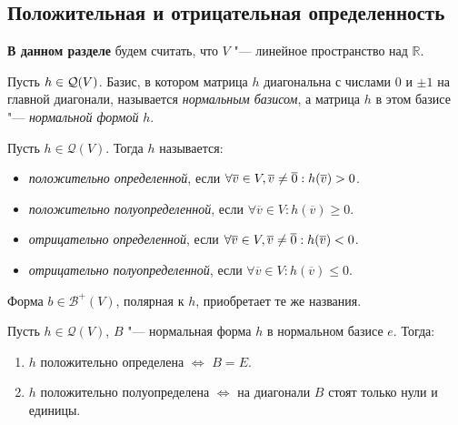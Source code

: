 \subsection{Положительная и отрицательная определенность}

\textbf{В данном разделе} будем считать, что $V$ "--- линейное пространство над $\mathbb{R}$.

\begin{definition}
	Пусть $h \hm{\in} \mathcal{Q}(V)$. Базис, в котором матрица $h$ диагональна с числами $0$ и $\pm1$ на главной диагонали, называется \textit{нормальным базисом}, а матрица $h$ в этом базисе "--- \textit{нормальной формой} $h$.
\end{definition}

\begin{definition}
	Пусть $h \in \mathcal{Q}(V)$. Тогда $h$ называется:
	\begin{itemize}
		\item \textit{положительно определенной}, если $\forall \overline{v} \hm{\in} V, \overline{v} \ne \overline{0}: h(\overline{v}) \hm{>} 0$.
		\item \textit{положительно полуопределенной}, если $\forall \overline{v} \in V: h(\overline{v}) \ge 0$.
		\item \textit{отрицательно определенной}, если $\forall \overline{v} \in V, \overline{v} \ne \overline{0}: h(\overline{v}) \hm{<} 0$.
		\item \textit{отрицательно полуопределенной}, если $\forall \overline{v} \in V: h(\overline{v}) \le 0$.
	\end{itemize}
	
	Форма $b \in \mathcal{B}^+(V)$, полярная к $h$, приобретает те же названия.
\end{definition}

\begin{proposition}
	Пусть $h \in \mathcal{Q}(V)$, $B$ "--- нормальная форма $h$ в нормальном базисе $e$. Тогда:
	\begin{enumerate}
		\item $h$ положительно определена $\Leftrightarrow$ $B = E$.
		\item $h$ положительно полуопределена $\Leftrightarrow$ на диагонали $B$ стоят только нули и единицы.
	\end{enumerate}
\end{proposition}

